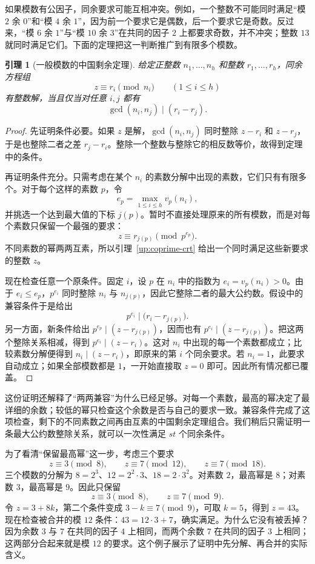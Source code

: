 \documentclass[UTF8,a4paper,oneside,openany,fontset=fandol,zihao=-4]{ctexbook}
\theoremstyle{guide}
\newtheorem{lemma}[theorem]{引理}
\begin{document}
如果模数有公因子，同余要求可能互相冲突。例如，一个整数不可能同时满足“模 $2$ 余 $0$”和“模 $4$ 余 $1$”，因为前一个要求它是偶数，后一个要求它是奇数。反过来，“模 $6$ 余 $1$”与“模 $10$ 余 $3$”在共同的因子 $2$ 上都要求奇数，并不冲突；整数 $13$ 就同时满足它们。下面的定理把这一判断推广到有限多个模数。

\begin{lemma}[一般模数的中国剩余定理]\label{up:general-crt}
给定正整数 $n_1,\ldots,n_h$ 和整数 $r_1,\ldots,r_h$，同余方程组
\[
z\equiv r_i\pmod{n_i}\qquad(1\leq i\leq h)
\]
有整数解，当且仅当对任意 $i,j$ 都有
\[
\gcd(n_i,n_j)\mid(r_i-r_j).
\]
\end{lemma}

\begin{proof}
先证明条件必要。如果 $z$ 是解，$\gcd(n_i,n_j)$ 同时整除 $z-r_i$ 和 $z-r_j$，于是也整除二者之差 $r_j-r_i$。整除一个整数与整除它的相反数等价，故得到定理中的条件。

再证明条件充分。只需考虑在某个 $n_i$ 的素数分解中出现的素数，它们只有有限多个。对于每个这样的素数 $p$，令
\[
e_p=\max_{1\leq i\leq h}v_p(n_i),
\]
并挑选一个达到最大值的下标 $j(p)$。暂时不直接处理原来的所有模数，而是对每个素数只保留一个最强的要求：
\[
z\equiv r_{j(p)}\pmod{p^{e_p}}.
\]
不同素数的幂两两互素，所以引理~\ref{up:coprime-crt} 给出一个同时满足这些新要求的整数 $z$。

现在检查任意一个原条件。固定 $i$，设 $p$ 在 $n_i$ 中的指数为 $e_i=v_p(n_i)>0$。由于 $e_i\leq e_p$，$p^{e_i}$ 同时整除 $n_i$ 与 $n_{j(p)}$，因此它整除二者的最大公约数。假设中的兼容条件于是给出
\[
p^{e_i}\mid\bigl(r_i-r_{j(p)}\bigr).
\]
另一方面，新条件给出 $p^{e_p}\mid(z-r_{j(p)})$，因而也有 $p^{e_i}\mid(z-r_{j(p)})$。把这两个整除关系相减，得到 $p^{e_i}\mid(z-r_i)$。这对 $n_i$ 中出现的每一个素数都成立；比较素数分解便得到 $n_i\mid(z-r_i)$，即原来的第 $i$ 个同余要求。若 $n_i=1$，此要求自动成立；如果全部模数都是 $1$，一开始直接取 $z=0$ 即可。因此所有情况都已覆盖。
\end{proof}

这份证明还解释了“两两兼容”为什么已经足够。对每一个素数，最高的幂决定了最详细的余数；较低的幂只检查这个余数是否与自己的要求一致。兼容条件完成了这项检查，剩下的不同素数之间再由互素的中国剩余定理组合。我们稍后只需证明一条最大公约数整除关系，就可以一次性满足 $st$ 个同余条件。

为了看清“保留最高幂”这一步，考虑三个要求
\[
z\equiv3\pmod8,\qquad z\equiv7\pmod{12},\qquad z\equiv7\pmod{18}.
\]
三个模数的分解为 $8=2^3$、$12=2^2\cdot3$、$18=2\cdot3^2$。对素数 $2$，最高幂是 $8$；对素数 $3$，最高幂是 $9$。因此只保留
\[
z\equiv3\pmod8,\qquad z\equiv7\pmod9.
\]
令 $z=3+8k$，第二个条件变成 $3-k\equiv7\pmod9$，可取 $k=5$，得到 $z=43$。现在检查被合并的模 $12$ 条件：$43=12\cdot3+7$，确实满足。为什么它没有被丢掉？因为余数 $3$ 与 $7$ 在共同的因子 $4$ 上相同，而两个余数 $7$ 在共同的因子 $3$ 上相同；这两部分合起来就是模 $12$ 的要求。这个例子展示了证明中先分解、再合并的实际含义。
\end{document}
